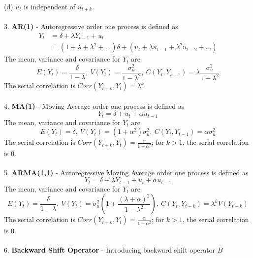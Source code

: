 \documentclass{article}
\begin{document}
\begin{enumerate}[S1 - ]
    (d) $u_t$ is independent of $u_{t+k}$.\\
    \\
    3. \textbf{AR(1)} - Autoregressive order one process is defined as
    \begin{equation*}
    \begin{split}
    Y_t & = \delta + \lambda Y_{t-1} + u_t\\
        & = (1+\lambda+\lambda^2+...)\delta + (u_t + \lambda u_{t-1} + \lambda^2 u_{t-2} +...)
    \end{split}
    \end{equation*}
    The mean, variance and covariance for $Y_t$ are
    \begin{equation*}
    E(Y_t) = \frac{\delta}{1-\lambda}, \ V(Y_t) = \frac{\sigma_u^2}{1-\lambda^2}, \ C(Y_t,Y_{t-1}) = \lambda \frac{\sigma_u^2}{1-\lambda^2}
    \end{equation*}
    The serial correlation is $Corr(Y_{t+k},Y_t) = \lambda^k$.\\
    \\
    4. \textbf{MA(1)} - Moving Average order one process is defined as
    \begin{equation*}
    Y_t = \delta + u_t + \alpha u_{t-1}
    \end{equation*}
    The mean, variance and covariance for $Y_t$ are
    \begin{equation*}
    E(Y_t) = \delta, \ V(Y_t) = (1+\alpha^2)\sigma_u^2, \ C(Y_t,Y_{t-1}) = \alpha \sigma_u^2
    \end{equation*}
    The serial correlation is $Corr(Y_{t+k},Y_t) = \frac{\alpha}{1+\alpha^2}$; for $k>1$, the serial correlation is 0.\\
    \\
    5. \textbf{ARMA(1,1)} - Autoregressive Moving Average order one process is defined as
    \begin{equation*}
    Y_t = \delta + \lambda Y_{t-1}+ u_t + \alpha u_{t-1}
    \end{equation*}
    The mean, variance and covariance for $Y_t$ are
    \begin{equation*}
    E(Y_t) = \frac{\delta}{1-\lambda}, \ V(Y_t) = \sigma_u^2\left(1+\frac{(\lambda+\alpha)^2}{1-\lambda^2}\right), \ C(Y_t,Y_{t-k}) = \lambda^kV(Y_{t-k})
    \end{equation*}
    The serial correlation is $Corr(Y_{t+k},Y_t) = \frac{\alpha}{1+\alpha^2}$; for $k>1$, the serial correlation is 0.\\
    \\
    6. \textbf{Backward Shift Operator} - Introducing backward shift operator $B$

\end{enumerate}
\end{document}
